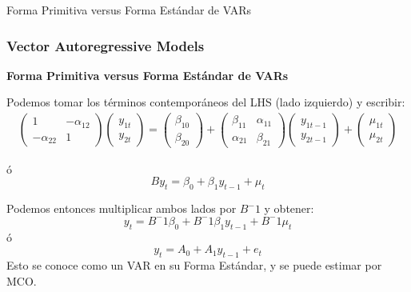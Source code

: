\documentclass[spanish,xcolor=table]{beamer}
\begin{document}
\begin{section}{Forma Primitiva versus Forma Estándar de VARs}
\begin{frame}
\end{frame}
\begin{frame}
\frametitle{Vector Autoregressive Models}

\textbf{Forma Primitiva versus Forma Estándar de VARs}

Podemos tomar los t\'erminos contempor\'aneos del LHS (lado izquierdo) y escribir:
\begin{gather*}
\begin{pmatrix} 1 & -\alpha_{12} \\ -\alpha_{22} & 1 \end{pmatrix}
\begin{pmatrix} y_{1t} \\ y_{2t} \end{pmatrix}
 =
\begin{pmatrix} \beta_{10} \\ \beta_{20} \end{pmatrix}
+
\begin{pmatrix} \beta_{11} & \alpha_{11} \\ \alpha_{21} & \beta_{21} \end{pmatrix}
\begin{pmatrix} y_{1t-1} \\ y_{2t-1} \end{pmatrix}
+
\begin{pmatrix} \mu_{1t} \\ \mu_{2t} \end{pmatrix}
\end{gather*}

\'o
\begin{equation*}
By_{t} = \beta_{0} + \beta_{1} y_{t-1} + \mu_t
\end{equation*}

Podemos entonces multiplicar ambos lados por $B^-1$ y obtener:
\begin{equation*}
y_{t} = B^-1\beta_{0} + B^-1\beta_{1} y_{t-1} + B^-1\mu_t
\end{equation*}
\'o
\begin{equation*}
y_{t} = A_{0} + A_{1} y_{t-1} + e_t
\end{equation*}
Esto se conoce como un VAR en su Forma Est\'andar, y se puede estimar por MCO.

\end{frame}
\end{section}
\end{document}
